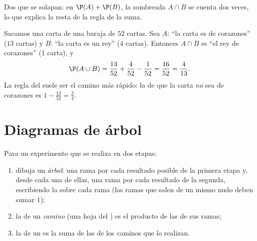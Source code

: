 \begin{omfigure}

{\small Dos  que se solapan: en $\P(A) + \P(B)$, la 
sombreada $A \cap B$ se cuenta dos veces, lo que explica la resta de la
regla de la suma.}
\end{omfigure}

\begin{example}\label{ex:g10:proba:cards}
Sacamos una carta de una baraja de $52$ cartas. Sea $A$: ``la carta es de
corazones'' ($13$ cartas) y $B$: ``la carta es un rey'' ($4$ cartas).
Entonces $A \cap B$ es ``el rey de corazones'' ($1$ carta), y
\[
\P(A \cup B) = \frac{13}{52} + \frac{4}{52} - \frac{1}{52} = \frac{16}{52}
= \frac{4}{13}.
\]
La regla del  suele ser el camino más rápido: la
 de que la carta \emph{no} sea de corazones es
$1 - \frac{13}{52} = \frac34$.
\end{example}

\section{Diagramas de árbol}

\begin{method}\label{met:g10:proba:tree}
Para un experimento que se realiza en dos etapas:
\begin{enumerate}
  \item dibuja un \emph{árbol}: una rama por cada
        resultado posible de la primera etapa y, desde cada una de ellas,
        una rama por cada resultado de la segunda, escribiendo la
         sobre cada rama (las ramas que salen de un mismo nudo
        deben sumar $1$);
  \item la  de un \emph{camino} (una hoja del ) es el
        producto de las  de sus ramas;
  \item la  de un  es la suma de las  de
        los caminos que lo realizan.
\end{enumerate}
\end{method}

